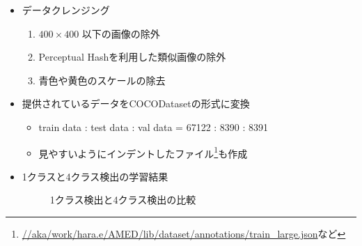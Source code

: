 \documentclass[a4j]{ujarticle}
\begin{document}
        \begin{itemize}
            \item データクレンジング
            \begin{enumerate}
                \item $400 \times 400$ 以下の画像の除外
                \item Perceptual Hashを利用した類似画像の除外
                \item 青色や黄色のスケールの除去
            \end{enumerate}

            \item 提供されているデータをCOCODatasetの形式に変換
            \begin{itemize}
                \item train data : test data : val data = 67122 : 8390 : 8391
                \item 見やすいようにインデントしたファイル\footnote{\url{//aka/work/hara.e/AMED/lib/dataset/annotations/train_large.json}など}も作成
            \end{itemize}

\clearpage

            \item 1クラスと4クラス検出の学習結果
            \begin{figure}[h]
                \centering
                \label{fig:compare}
                \caption{1クラス検出と4クラス検出の比較}
            \end{figure}


\end{itemize}
\end{document}
